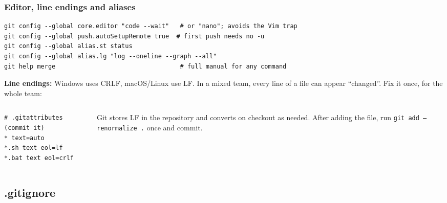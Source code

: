 \documentclass[aspectratio=169,10pt,compress]{beamer}
\newcommand{\cmd}[1]{\texttt{\color{gitred}#1}}
\begin{document}
\begin{frame}[t,fragile] \frametitle{Editor, line endings and aliases}
\begin{lstlisting}
git config --global core.editor "code --wait"   # or "nano"; avoids the Vim trap
git config --global push.autoSetupRemote true  # first push needs no -u
git config --global alias.st status
git config --global alias.lg "log --oneline --graph --all"
git help merge                                  # full manual for any command
\end{lstlisting}

  \textbf{Line endings:} Windows uses CRLF, macOS/Linux use LF. In a mixed team, every
  line of a file can appear ``changed''. Fix it once, for the whole team:
  \begin{columns}[T]
    \begin{column}{0.4\textwidth}
\begin{lstlisting}[language={}]
# .gitattributes (commit it)
* text=auto
*.sh text eol=lf
*.bat text eol=crlf
\end{lstlisting}
    \end{column}
    \begin{column}{0.56\textwidth}
      \small
      Git stores LF in the repository and converts on checkout as needed.
      After adding the file, run \cmd{git add --renormalize .} once and commit.
    \end{column}
  \end{columns}
\end{frame}

\subsection{.gitignore}
\end{document}
